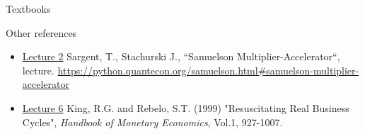 \documentclass{beamer}
\begin{document}
\begin{frame}{Textbooks}
  
\end{frame}

\begin{frame}{Other references}

\small
\begin{itemize}
  \item \underline{Lecture 2}  Sargent, T., Stachurski J., ``Samuelson Multiplier-Accelerator``, lecture. \url{https://python.quantecon.org/samuelson.html\#samuelson-multiplier-accelerator}
  \vfill
  \item \underline{Lecture 6}  King, R.G. and Rebelo, S.T. (1999) "Resuscitating Real Business Cycles", \emph{Handbook of Monetary Economics}, Vol.1, 927-1007.
\end{itemize}

\end{frame}
\end{document}
